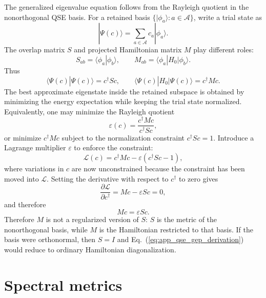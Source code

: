 \documentclass[
  reprint,
  amsmath,
  amssymb,
  aps,
  pra,
  nofootinbib,
  superscriptaddress,
  floatfix
]{revtex4-2}
\newcommand{\Acal}{\mathcal{A}}
\newcommand{\ket}[1]{|#1\rangle}
\newcommand{\bra}[1]{\langle #1|}
\newcommand{\braket}[2]{\langle #1|#2\rangle}
\begin{document}
The generalized eigenvalue equation follows from the Rayleigh quotient in the nonorthogonal QSE basis.  For a retained basis $\{\ket{\phi_a}:a\in\Acal\}$, write a trial state as
\begin{equation}
\ket{\Psi(c)}
=
\sum_{a\in\Acal}c_a\ket{\phi_a}.
\label{eq:app_qse_trial_state}
\end{equation}
The overlap matrix $S$ and projected Hamiltonian matrix $M$ play different roles:
\begin{equation}
S_{ab}=\braket{\phi_a}{\phi_b},
\qquad
M_{ab}=\bra{\phi_a}H_0\ket{\phi_b}.
\label{eq:app_qse_sm_def}
\end{equation}
Thus
\begin{equation}
\braket{\Psi(c)}{\Psi(c)}
=c^\dagger S c,
\qquad
\bra{\Psi(c)}H_0\ket{\Psi(c)}
=c^\dagger M c.
\label{eq:app_qse_norm_energy}
\end{equation}
The best approximate eigenstate inside the retained subspace is obtained by minimizing the energy expectation while keeping the trial state normalized.  Equivalently, one may minimize the Rayleigh quotient
\begin{equation}
\varepsilon(c)
=
\frac{c^\dagger M c}{c^\dagger S c},
\label{eq:app_qse_rayleigh}
\end{equation}
or minimize $c^\dagger M c$ subject to the normalization constraint $c^\dagger S c=1$.  Introduce a Lagrange multiplier $\varepsilon$ to enforce the constraint:
\begin{equation}
\mathcal L(c)
=
c^\dagger M c-\varepsilon(c^\dagger S c-1),
\label{eq:app_qse_lagrangian}
\end{equation}
where variations in $c$ are now unconstrained because the constraint has been moved into $\mathcal L$.  Setting the derivative with respect to $c^\dagger$ to zero gives
\begin{equation}
\frac{\partial\mathcal L}{\partial c^\dagger}
=
Mc-\varepsilon Sc
=0,
\label{eq:app_qse_lagrange_stationarity}
\end{equation}
and therefore
\begin{equation}
M c=\varepsilon S c.
\label{eq:app_qse_gep_derivation}
\end{equation}
Therefore $M$ is not a regularized version of $S$: $S$ is the metric of the nonorthogonal basis, while $M$ is the Hamiltonian restricted to that basis.  If the basis were orthonormal, then $S=I$ and Eq.~(\ref{eq:app_qse_gep_derivation}) would reduce to ordinary Hamiltonian diagonalization.

\section{Spectral metrics}
\label{app:spectral_metrics}
\end{document}
